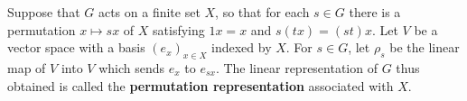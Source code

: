 Suppose that $G$ acts on a finite set $X$, so that for each $s \in G$ there is a permutation $x \mapsto sx$ of $X$ satisfying $1x = x$ and $s(tx) = (st)x$. Let $V$ be a vector space with a basis $(e_x)_{x \in X}$ indexed by $X$. For $s \in G$, let $\rho_s$ be the linear map of $V$ into $V$ which sends $e_x$ to $e_{sx}$. The linear representation of $G$ thus obtained is called the \textbf{permutation representation} associated with $X$.
